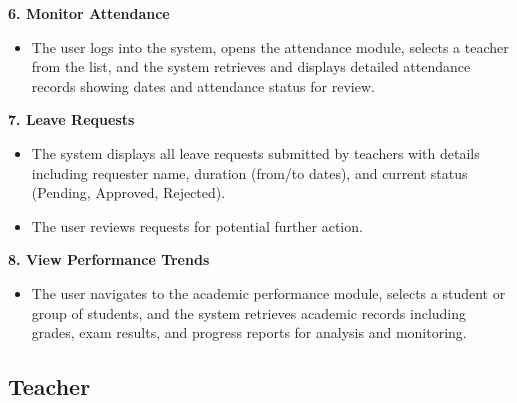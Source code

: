 \documentclass[12pt, a4paper]{report}
\begin{document}
\textbf{6. Monitor Attendance}
\begin{itemize}
    \item The user logs into the system, opens the attendance module, selects a teacher from the list, and the system retrieves and displays detailed attendance records showing dates and attendance status for review.
\end{itemize}

\textbf{7. Leave Requests}
\begin{itemize}
    \item The system displays all leave requests submitted by teachers with details including requester name, duration (from/to dates), and current status (Pending, Approved, Rejected).
    \item The user reviews requests for potential further action.
\end{itemize}

\textbf{8. View Performance Trends}
\begin{itemize}
    \item The user navigates to the academic performance module, selects a student or group of students, and the system retrieves academic records including grades, exam results, and progress reports for analysis and monitoring.
\end{itemize}

\subsection{Teacher}
\end{document}
